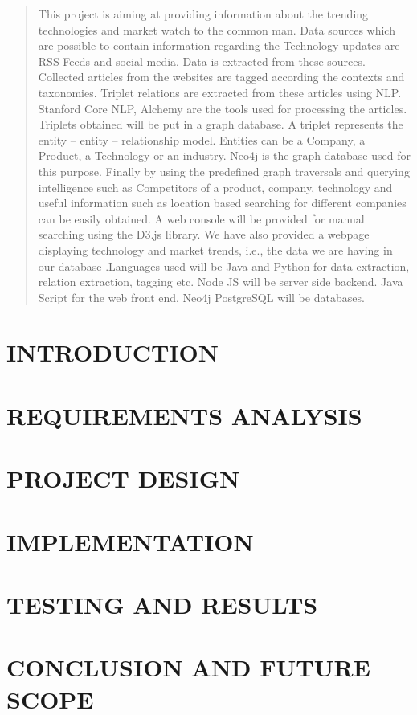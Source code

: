 \documentclass[12pt]{report}
\begin{document}
\begin{abstract}
This project is aiming at providing information about the trending technologies and market watch to the common man. Data sources which are possible to contain information regarding the Technology updates are RSS Feeds and social media. Data is extracted from these sources. Collected articles from the websites are tagged according the contexts and taxonomies. Triplet relations are extracted from these articles using NLP. Stanford Core NLP, Alchemy are the tools used for processing the articles. Triplets obtained will be put in a graph database. A triplet represents the entity – entity – relationship model. Entities can be a Company, a Product, a Technology or an industry. Neo4j is the graph database used for this purpose. Finally by using the predefined graph traversals and querying intelligence such as Competitors of a product, company, technology and useful information such as location based searching for different companies can be easily obtained. A web console will be provided for manual searching using the D3.js library. We have also provided a webpage displaying technology and market trends, i.e., the data we are having in our database .Languages used will be Java and Python for data extraction, relation extraction, tagging etc. Node JS will be server side backend. Java Script for the web front end. Neo4j  PostgreSQL will be databases.
\end{abstract}

\clearpage
{}
\tableofcontents		
\listoffigures
\chapter{INTRODUCTION}


\chapter{REQUIREMENTS ANALYSIS}


\chapter{PROJECT DESIGN}


\chapter{IMPLEMENTATION}


\chapter{TESTING AND RESULTS}


\chapter{CONCLUSION AND FUTURE SCOPE}


\end{document}
